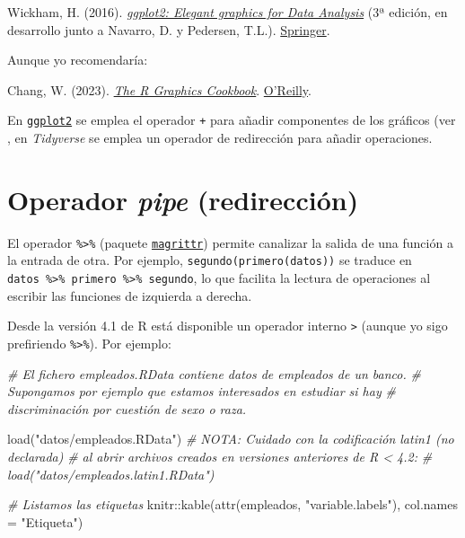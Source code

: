 \documentclass[
]{book}
\newenvironment{Shaded}{\begin{snugshade}}{\end{snugshade}}
\newcommand{\AttributeTok}[1]{\textcolor[rgb]{0.77,0.63,0.00}{#1}}
\newcommand{\CommentTok}[1]{\textcolor[rgb]{0.56,0.35,0.01}{\textit{#1}}}
\newcommand{\FunctionTok}[1]{\textcolor[rgb]{0.00,0.00,0.00}{#1}}
\newcommand{\NormalTok}[1]{#1}
\newcommand{\SpecialCharTok}[1]{\textcolor[rgb]{0.00,0.00,0.00}{#1}}
\newcommand{\StringTok}[1]{\textcolor[rgb]{0.31,0.60,0.02}{#1}}
\theoremstyle{break}
\theoremstyle{nonumberplain}
\begin{document}
Wickham, H. (2016). \emph{\href{https://ggplot2-book.org}{ggplot2: Elegant graphics for Data Analysis}} (3ª edición, en desarrollo junto a Navarro, D. y Pedersen, T.L.). \href{https://www.amazon.com/gp/product/331924275X}{Springer}.

Aunque yo recomendaría:

Chang, W. (2023). \emph{\href{https://r-graphics.org}{The R Graphics Cookbook}}. \href{https://www.amazon.com/dp/1491978600}{O'Reilly}.

En \href{https://ggplot2.tidyverse.org}{\texttt{ggplot2}} se emplea el operador \texttt{+} para añadir componentes de los gráficos (ver , en \emph{Tidyverse} se emplea un operador de redirección para añadir operaciones.

\hypertarget{pipe}{%
\section{\texorpdfstring{Operador \emph{pipe} (redirección)}{Operador pipe (redirección)}}\label{pipe}}

El operador \texttt{\%\textgreater{}\%} (paquete \href{https://magrittr.tidyverse.org}{\texttt{magrittr}}) permite canalizar la salida de una función a la entrada de otra.
Por ejemplo, \texttt{segundo(primero(datos))} se traduce en \texttt{datos\ \%\textgreater{}\%\ primero\ \%\textgreater{}\%\ segundo}, lo que facilita la lectura de operaciones al escribir las funciones de izquierda a derecha.

Desde la versión 4.1 de R está disponible un operador interno \texttt{\textbar{}\textgreater{}} (aunque yo sigo prefiriendo \texttt{\%\textgreater{}\%}).
Por ejemplo:

\begin{Shaded}
\begin{Highlighting}[]
\CommentTok{\# El fichero \textquotesingle{}empleados.RData\textquotesingle{} contiene datos de empleados de un banco.}
\CommentTok{\# Supongamos por ejemplo que estamos interesados en estudiar si hay}
\CommentTok{\# discriminación por cuestión de sexo o raza.}

\FunctionTok{load}\NormalTok{(}\StringTok{"datos/empleados.RData"}\NormalTok{)}
\CommentTok{\# NOTA: Cuidado con la codificación latin1 (no declarada) }
\CommentTok{\# al abrir archivos creados en versiones anteriores de R \textless{} 4.2: }
\CommentTok{\# load("datos/empleados.latin1.RData")}

\CommentTok{\# Listamos las etiquetas}
\NormalTok{knitr}\SpecialCharTok{::}\FunctionTok{kable}\NormalTok{(}\FunctionTok{attr}\NormalTok{(empleados, }\StringTok{"variable.labels"}\NormalTok{), }\AttributeTok{col.names =} \StringTok{"Etiqueta"}\NormalTok{)}
\end{Highlighting}
\end{Shaded}
\end{document}
